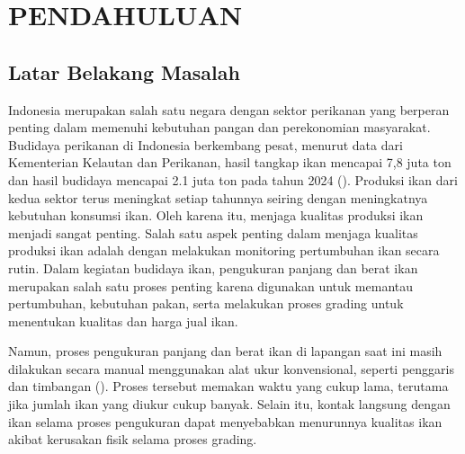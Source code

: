 
\chapter{PENDAHULUAN}

\section{Latar Belakang Masalah}

Indonesia merupakan salah satu negara dengan sektor perikanan yang berperan penting dalam memenuhi kebutuhan pangan dan perekonomian masyarakat. 
Budidaya perikanan di Indonesia berkembang pesat, menurut data dari Kementerian Kelautan dan Perikanan, hasil tangkap ikan mencapai 7,8 juta ton dan hasil budidaya mencapai 2.1 juta ton pada tahun 2024 (\cite{KKP2024}). 
Produksi ikan dari kedua sektor terus meningkat setiap tahunnya seiring dengan meningkatnya kebutuhan konsumsi ikan. Oleh karena itu, menjaga kualitas produksi ikan menjadi sangat penting. Salah satu aspek penting dalam menjaga kualitas produksi ikan adalah dengan melakukan monitoring pertumbuhan ikan secara rutin.
Dalam kegiatan budidaya ikan, pengukuran panjang dan berat ikan merupakan salah satu proses penting karena digunakan untuk memantau pertumbuhan, kebutuhan pakan, serta melakukan proses grading untuk menentukan kualitas dan harga jual ikan.

Namun, proses pengukuran panjang dan berat ikan di lapangan saat ini masih dilakukan secara manual menggunakan alat ukur konvensional, seperti penggaris dan timbangan (\cite{Amri2020}).
Proses tersebut memakan waktu yang cukup lama, terutama jika jumlah ikan yang diukur cukup banyak. Selain itu, kontak langsung dengan ikan selama proses pengukuran dapat menyebabkan menurunnya kualitas ikan akibat kerusakan fisik selama proses grading.

